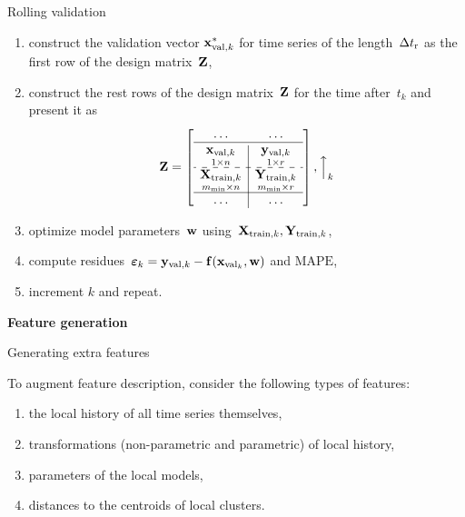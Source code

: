 \documentclass{beamer}
\begin{document}
\begin{frame}{Rolling validation}

\begin{enumerate}[1)]
\item construct the validation vector ${\mathbf{x}}^*_{\text{val},k}$ for time series of the length~$\Delta t_\text{r}$ as the first row of the design matrix~${\mathbf{Z}}$,
\item construct the rest rows of the design matrix~${\mathbf{Z}}$ for the time after~$t_k$ and present it as
 \[\bZ = \left[\begin{array}{c|c}
 \dots & \dots \\
 \hline
 \underset{1{\times}n}{\bx_{\text{val}, k}} & \underset{1{\times}r}{\by_{\text{val}, k}}  \\
 \hdashline
 \underset{m_{\min}{\times}n}{\bX_{\text{train}, k}}  & \underset{m_{\min}{\times}r}{\bY_{\text{train}, k}} \\
 \hline
 \dots & \dots \\
 \end{array}\right], \Big{\uparrow}_{k}
 \]
\item optimize model parameters~$\mathbf{w}$ using~${\mathbf{X}}_{\text{train}, k}, \mathbf{Y}_{\text{train}, k}$,
\item compute residues~${\boldsymbol{\varepsilon}}_k = {\mathbf{y}}_{\text{val}, k} - {\mathbf{f}}({\mathbf{x}}_{\text{val}_k}, \mathbf{w})$ and $\text{MAPE}$,
\item increment $k$ and repeat.
\end{enumerate}

\end{frame}
\begin{frame}
\vfill
\begin{center}
{\Large \bf Feature generation}
\end{center}
\vfill
\end{frame}
\begin{frame}{Generating extra features}

To augment feature description, consider the following types of features:
\begin{enumerate}[1)]
\item the local history of all time series themselves,
\item transformations (non-parametric and parametric) of local history,
\item parameters of the local models,
\item distances to the centroids of local clusters.
\end{enumerate}

\end{frame}
\end{document}
